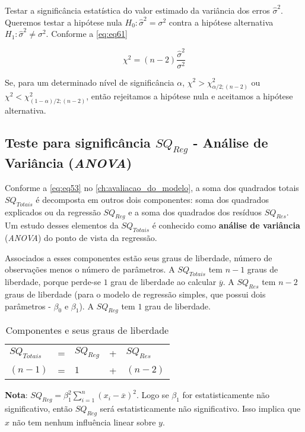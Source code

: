 \noindent Testar a significância estatística do valor estimado da variância dos erros $\hat{\sigma}^2$. Queremos testar a hipótese nula $H_0: \hat{\sigma}^2 = \sigma^2$ contra a hipótese alternativa $H_1: \hat{\sigma}^2 \neq \sigma^2$. Conforme a \autoref{eq:eq61}

\begin{equation}
    \chi^2 = (n-2)\dfrac{\hat{\sigma}^2}{\sigma^2}
\end{equation}

\noindent Se, para um determinado nível de significância $\alpha$, $\chi^2 > \chi^2_{\alpha/2;(n-2)}$ ou  $\chi^2 < \chi^2_{(1-\alpha)/2;(n-2)}$, então rejeitamos a hipótese nula e aceitamos a hipótese alternativa.

\subsection{Teste para significância $SQ_{Reg}$ - Análise de Variância (\textit{ANOVA})}

\noindent Conforme a \autoref{eq:eq53} no \autoref{ch:avaliacao_do_modelo}, a soma dos quadrados totais $SQ_{Totais}$ é decomposta em outros dois componentes: soma dos quadrados explicados ou da regressão $SQ_{Reg}$ e a soma dos quadrados dos resíduos $SQ_{Res}$. Um estudo desses elementos da $SQ_{Totais}$ é conhecido como \textbf{análise de variância} (\textit{ANOVA}) do ponto de vista da regressão.

\noindent Associados a esses componentes estão seus graus de liberdade, número de observações menos o número de parâmetros. A $SQ_{Totais}$ tem $n-1$ graus de liberdade, porque perde-se $1$ grau de liberdade ao calcular $\overline{y}$. A $SQ_{Res}$ tem $n-2$ graus de liberdade (para o modelo de regressão simples, que possui dois parâmetros - $\beta_0$ e $\beta_1$). A $SQ_{Reg}$ tem $1$ grau de liberdade. 

\begin{table}[H]
\centering
\caption{Componentes e seus graus de liberdade}
\begin{tabular}{lllll}
\hline
 $SQ_{Totais}$ & =  & $SQ_{Reg}$  & +   &  $SQ_{Res}$\\
 $(n-1)$ & =   & $1$ & + & $(n-2)$  \\ \hline
\end{tabular}%
\label{Tab: tabela4}
\end{table}

\noindent \textbf{Nota}: $SQ_{Reg} = \beta_1^2 \sum_{i=1}^{n} (x_i - \overline{x})^2$. Logo se $\beta_1$ for estatisticamente não significativo, então $SQ_{Reg}$ será estatisticamente não significativo. Isso implica que $x$ não tem nenhum influência linear sobre $y$.\\

